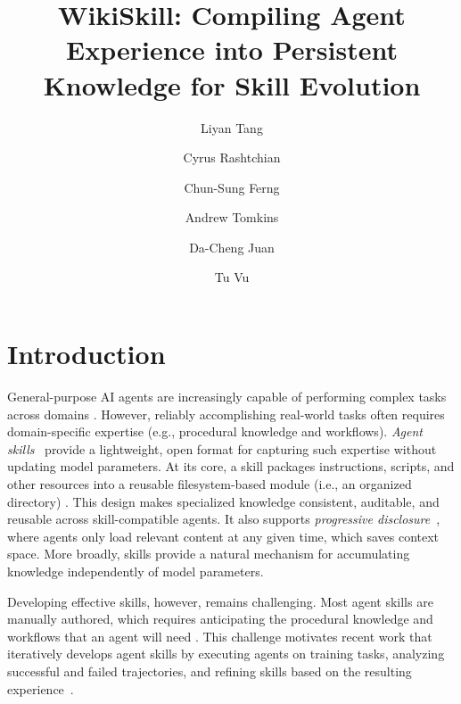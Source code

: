 \documentclass[11pt, a4paper, copyright, gr]{google}
\title{WikiSkill: Compiling Agent Experience into Persistent Knowledge for Skill Evolution}
\author[1]{Liyan Tang}
\author[1]{Cyrus Rashtchian}
\author[1]{Chun-Sung Ferng}
\author[1]{Andrew Tomkins}
\author[1]{Da-Cheng Juan}
\author[1,2]{Tu Vu}
\affil[1]{Google Research}
\affil[2]{Virginia Tech}
\begin{document}
\maketitle



\section{Introduction}
\label{sec:introduction}

General-purpose AI agents are increasingly capable of performing complex tasks across domains \citep{patwardhan2026gdpval,jackson2025aa,merrill2026terminalbench,phan2025humanity}. However, reliably accomplishing real-world tasks often requires domain-specific expertise (e.g., procedural knowledge and workflows). \emph{Agent skills}~\citep{zhang2025equipping,li2026skillsbench,chen2026skillcraftllmagentslearn, liu2026agenticskillsworkwild} provide a lightweight, open format for capturing such expertise without updating model parameters. At its core, a skill packages instructions, scripts, and other resources into a reusable filesystem-based module (i.e., an organized directory) \citep{zhang2025equipping, li2026skillsbench,anthropic2026buildingskills, xia2026metaclawjusttalk}. This design makes specialized knowledge consistent, auditable, and reusable across skill-compatible agents. It also supports \emph{progressive disclosure}~\citep{jiang2026sok}, where 
agents only load relevant content at any given time, which saves context space. More broadly, skills provide a natural mechanism for accumulating knowledge independently of model parameters.

Developing effective skills, however, remains challenging. Most agent skills are manually authored, which requires anticipating the procedural knowledge and workflows that an agent will need \citep{li2026skillsbench, liang2026skillnet, xu2026agentskillslargelanguage}. This challenge motivates recent work that iteratively develops agent skills by executing agents on training tasks, analyzing successful and failed trajectories, and refining skills based on the resulting experience~\citep{yuksekgonul2025optimizing,agrawal2026gepa,alzubi2026evoskill,ni2026trace2skill,ouyang2026skillos,yang2026skillopt}.
\end{document}
